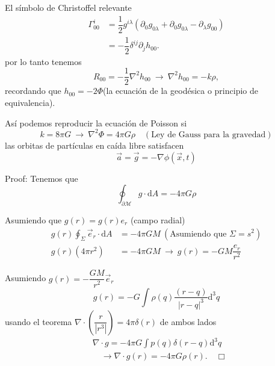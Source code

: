 \documentclass[../main]{subfiles}
\begin{document}
\begin{adjustwidth}{0pt}{-100pt}
El símbolo de Christoffel relevante 
\begin{equation}
    \begin{split}
        \Gamma^{i}_{00}&=\dfrac{1}{2}g^{i\lambda}(\partial_0 g_{0\lambda}+\partial_0 g_{0\lambda}-\partial_{\lambda}g_{00})\\
        &=-\dfrac{1}{2}\delta^{ij}\partial_j h_00.
    \end{split}
\end{equation}
por lo tanto tenemos 
\begin{equation}
    R_{00}=-\dfrac{1}{2}\nabla^2 h_00 \ \rightarrow \ \nabla^2 h_{00}=-k\rho,
\end{equation}
recordando que $h_{00}=-2\Phi$(la ecuación de la geodésica o principio de equivalencia).

Así podemos reproducir la ecuación de Poisson si 
\begin{equation}
    k=8\pi G \ \rightarrow \ \nabla^2 \Phi = 4\pi G\rho \quad (\text{Ley de Gauss para la gravedad})
\end{equation}
las orbitas de partículas en caída libre satisfacen 
\begin{equation}
    \vec{a}=\vec{g}=-\nabla \phi(\vec{x}, t)
\end{equation}

Proof: Tenemos que 
\begin{equation}
    \oint_{\partial \mathcal{M}} g \cdot \mathrm{d}A=-4\pi G\rho 
\end{equation}

Asumiendo que $g(r)=g(r)e_r$ (campo radial)
\begin{equation}
    \begin{split}
        g(r)\oint_{\Sigma} \vec{e}_r \cdot \mathrm{d}A &=-4\pi GM \ (\text{Asumiendo que } \Sigma=s^2) \\
        g(r)(4\pi r^2)&=-4\pi GM \ \rightarrow \ g(r)=-GM\dfrac{e_r}{r^2}
    \end{split}
\end{equation}

Asumiendo $g(r)=-\dfrac{GM}{r^2}\vec{e}_r$
\begin{equation}
    g(r)=-G\int \rho(q) \dfrac{(r-q)}{|r-q|^3}\mathrm{d}^3 q
\end{equation}
usando el teorema $\nabla \cdot \left(\dfrac{r}{|r^3|}\right)=4\pi \delta(r)$ de ambos lados 
\begin{equation}
    \begin{split}
        &\nabla \cdot g= -4\pi G \int p(q)\delta(r-q)\mathrm{d}^3 q \\
        &\quad \rightarrow \nabla \cdot g(r)=-4\pi G\rho(r). \quad \Box
    \end{split}
\end{equation}


\end{adjustwidth}
\end{document}
